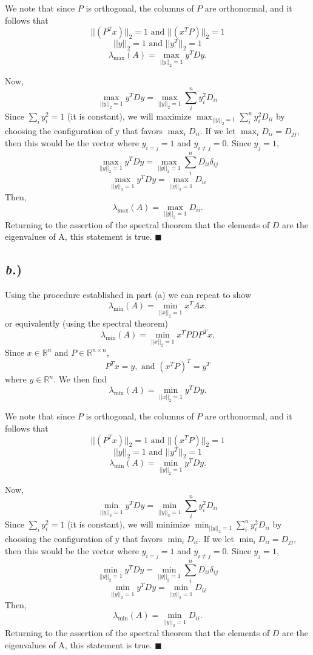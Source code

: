 \documentclass{report}
\begin{document}
We note that since $P$ is orthogonal, the columns of $P$ are orthonormal, and it follows that
$$ ||(P^Tx)||_2 = 1 \text{ and }  ||(x^TP)||_2 = 1 $$
$$ ||y||_2 = 1 \text{ and } ||y^T||_2 = 1 $$
$$\lambda_{\text{max}}(A) = \max_{||y||_2=1}{y^TDy}.$$

Now, 
$$\max_{||y||_2=1}{y^TDy} = \max_{||y||_2=1}{\sum_i^n{y_i^2 D_{ii}}}$$
Since $\sum_i{y_i^2} = 1$ (it is constant), we will maximize $\max_{||y||_2=1}{\sum_i^n{y_i^2 D_{ii}}}$ by choosing the configuration of y that favors $\max_i{D_{ii}}$. If we let 
$\max_i{D_{ii}} = D_{jj},$ then this would be the vector where $y_{i=j} = 1$ and $y_{i \neq j} = 0$. Since $y_j = 1$,
$$\max_{||y||_2=1}{y^TDy} = \max_{||y||_2=1}{\sum_i^n{ D_{ii}\delta_{ij}}}$$
$$\max_{||y||_2=1}{y^TDy} = \max_{||y||_2=1}{D_{ii}}$$
Then,
$$\lambda_{\text{max}}(A) = \max_{||y||_2=1}{D_{ii}}.$$
Returning to the assertion of the spectral theorem that the elements of $D$ are the eigenvalues of A, this statement is true. $\blacksquare$

\subsection*{\textit{b.})}

Using the procedure established in part (a) we can repeat to show
$$\lambda_{\text{min}}(A) = \min_{||x||_2=1}{x^TAx}.$$
or equivalently (using the spectral theorem)
$$\lambda_{\text{min}}(A) = \min_{||x||_2=1}{x^TPDP^Tx}.$$
Since $x \in \mathbb{R}^n$ and $P \in \mathbb{R}^{n \times n}$,
$$ P^Tx = y, \text{ and } (x^TP)^T = y^T $$
where $y \in \mathbb{R}^n$. We then find
$$\lambda_{\text{min}}(A) = \min_{||x||_2=1}{y^TDy}.$$

We note that since $P$ is orthogonal, the columns of $P$ are orthonormal, and it follows that
$$ ||(P^Tx)||_2 = 1 \text{ and }  ||(x^TP)||_2 = 1 $$
$$ ||y||_2 = 1 \text{ and } ||y^T||_2 = 1 $$
$$\lambda_{\text{min}}(A) = \min_{||y||_2=1}{y^TDy}.$$

Now, 
$$\min_{||y||_2=1}{y^TDy} = \min_{||y||_2=1}{\sum_i^n{y_i^2 D_{ii}}}$$
Since $\sum_i{y_i^2} = 1$ (it is constant), we will minimize $\min_{||y||_2=1}{\sum_i^n{y_i^2 D_{ii}}}$ by choosing the configuration of y that favors $\min_i{D_{ii}}$. If we let 
$\min_i{D_{ii}} = D_{jj},$ then this would be the vector where $y_{i=j} = 1$ and $y_{i \neq j} = 0$. Since $y_j = 1$,
$$\min_{||y||_2=1}{y^TDy} = \min_{||y||_2=1}{\sum_i^n{ D_{ii}\delta_{ij}}}$$
$$\min_{||y||_2=1}{y^TDy} = \min_{||y||_2=1}{D_{ii}}$$
Then,
$$\lambda_{\text{min}}(A) = \min_{||y||_2=1}{D_{ii}}.$$
Returning to the assertion of the spectral theorem that the elements of $D$ are the eigenvalues of A, this statement is true. $\blacksquare$
\end{document}
